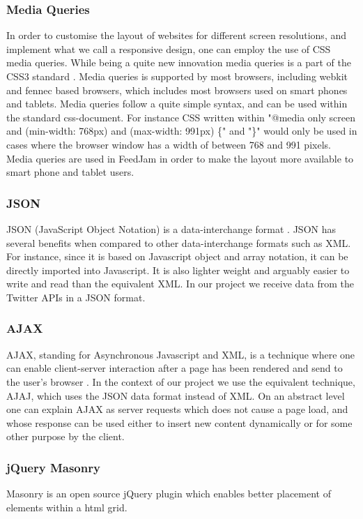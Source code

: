 \subsubsection{Media Queries} %
In order to customise the layout of websites for different screen resolutions, and implement what we call a responsive design, one can employ the use of CSS media queries. While being a quite new innovation media queries is a part of the CSS3 standard \cite{W3C}. Media queries is supported by most browsers, including webkit and fennec based browsers, which includes most browsers used on smart phones and tablets. Media queries follow a quite simple syntax, and can be used within the standard css-document. For instance CSS written within "@media only screen and (min-width: 768px) and (max-width: 991px) \{" and "\}" would only be used in cases where the browser window has a width of between 768 and 991 pixels. Media queries are used in FeedJam in order to make the layout more available to smart phone and tablet users.

\subsubsection{JSON}
JSON (JavaScript Object Notation) is a data-interchange format \cite{Crockford2011}. JSON has several benefits when compared to other data-interchange formats such as XML. For instance, since it is based on Javascript object and array notation, it can be directly imported into Javascript. It is also lighter weight and arguably easier to write and read than the equivalent XML. In our project we receive data from the Twitter APIs in a JSON format.

\subsubsection{AJAX}%
AJAX, standing for Asynchronous Javascript and XML, is a technique where one can enable client-server interaction after a page has been rendered and send to the user's browser \cite{Garrett2005}. In the context of our project we use the equivalent technique, AJAJ, which uses the JSON data format instead of XML. On an abstract level one can explain AJAX as server requests which does not cause a page load, and whose response can be used either to insert new content dynamically or for some other purpose by the client.

\subsubsection{jQuery Masonry}
Masonry is an open source jQuery plugin which enables better placement of elements within a  html grid.

